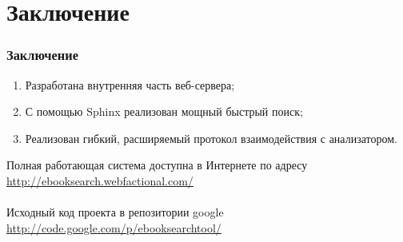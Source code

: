 \documentclass[utf8,handout]{beamer}
\begin{document}
\section{Заключение}
	\begin{frame}
		\frametitle{Заключение}
		\begin{block}{}
			\begin{enumerate}
				\item Разработана внутренняя часть веб-сервера;
				\item С помощью Sphinx реализован мощный быстрый поиск;
				\item Реализован гибкий, расширяемый протокол взаимодействия с анализатором.
			\end{enumerate}
		\end{block}
		\begin{block}{}
		Полная работающая система доступна в Интернете по адресу\\ \url{http://ebooksearch.webfactional.com/} \\
		~\\
		Исходный код проекта в репозитории google\\ \url{http://code.google.com/p/ebooksearchtool/}
		\end{block}
	\end{frame}
	
\end{document}
